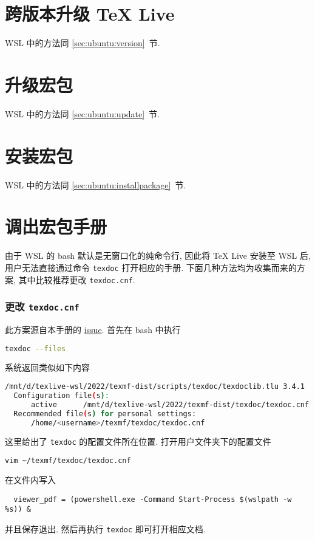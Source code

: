 \section{跨版本升级 \TeX{} Live}

WSL 中的方法同 \ref{sec:ubuntu:version}~节.

\section{升级宏包}

WSL 中的方法同 \ref{sec:ubuntu:update}~节.

\section{安装宏包}

WSL 中的方法同 \ref{sec:ubuntu:installpackage}~节.

\section{调出宏包手册}

由于 WSL 的 \textsf{bash} 默认是无窗口化的纯命令行,
因此将 \TeX{} Live 安装至 WSL 后,
用户无法直接通过命令 \texttt{texdoc} 打开相应的手册.
下面几种方法均为收集而来的方案,
其中比较推荐更改 \texttt{texdoc.cnf}.

\subsubsection{更改 \texttt{texdoc.cnf}}

此方案源自本手册的 \href{https://github.com/OsbertWang/install-latex-guide-zh-cn/issues/13}{issue}.
首先在 \textsf{bash} 中执行
\begin{lstlisting}[language=bash]
  texdoc --files
\end{lstlisting}
系统返回类似如下内容
\begin{lstlisting}[language=bash]
  /mnt/d/texlive-wsl/2022/texmf-dist/scripts/texdoc/texdoclib.tlu 3.4.1
  Configuration file(s):
      active      /mnt/d/texlive-wsl/2022/texmf-dist/texdoc/texdoc.cnf
  Recommended file(s) for personal settings:
      /home/<username>/texmf/texdoc/texdoc.cnf
\end{lstlisting}
这里给出了 \texttt{texdoc} 的配置文件所在位置.
打开用户文件夹下的配置文件
\begin{lstlisting}[language=bash]
  vim ~/texmf/texdoc/texdoc.cnf
\end{lstlisting}
在文件内写入
\begin{lstlisting}
  viewer_pdf = (powershell.exe -Command Start-Process $(wslpath -w %s)) &
\end{lstlisting}
并且保存退出.
然后再执行 \texttt{texdoc} 即可打开相应文档.

